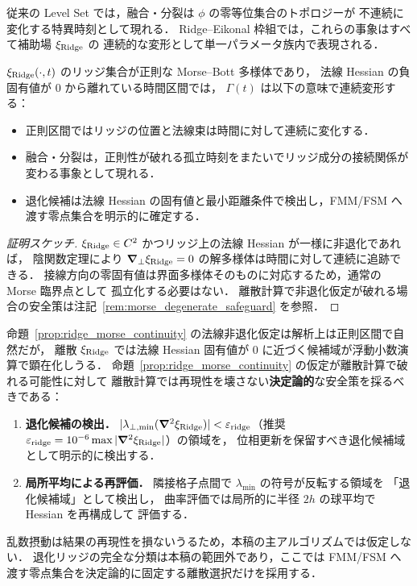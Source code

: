 従来の Level Set では，融合・分裂は $\phi$ の零等位集合のトポロジーが
不連続に変化する特異時刻として現れる．
Ridge--Eikonal 枠組では，これらの事象はすべて補助場 $\xi_{\text{Ridge}}$ の
連続的な変形として単一パラメータ族内で表現される．

\begin{proposition}[リッジ集合の正則区間での連続性]
\label{prop:ridge_morse_continuity}
$\xi_{\text{Ridge}}(\cdot, t)$ のリッジ集合が正則な Morse--Bott 多様体であり，
法線 Hessian の負固有値が 0 から離れている時間区間では，
$\Gamma(t)$ は以下の意味で連続変形する：
\begin{itemize}[leftmargin=1.5em, itemsep=0pt, topsep=2pt]
  \item 正則区間ではリッジの位置と法線束は時間に対して連続に変化する．
  \item 融合・分裂は，正則性が破れる孤立時刻をまたいでリッジ成分の接続関係が変わる事象として現れる．
  \item 退化候補は法線 Hessian の固有値と最小距離条件で検出し，FMM/FSM へ渡す零点集合を明示的に確定する．
\end{itemize}
\end{proposition}

\begin{proof}[\upshape 証明スケッチ]
$\xi_{\text{Ridge}} \in C^2$ かつリッジ上の法線 Hessian が一様に非退化であれば，
陰関数定理により $\bm{\nabla}_\perp\xi_{\text{Ridge}}=0$ の解多様体は時間に対して連続に追跡できる．
接線方向の零固有値は界面多様体そのものに対応するため，通常の Morse 臨界点として
孤立化する必要はない．
離散計算で非退化仮定が破れる場合の安全策は注記~\ref{rem:morse_degenerate_safeguard} を参照．
\end{proof}

\begin{remark}[退化リッジに対する数値的安全策]
\label{rem:morse_degenerate_safeguard}
命題~\ref{prop:ridge_morse_continuity} の法線非退化仮定は解析上は正則区間で自然だが，
離散 $\xi_{\text{Ridge}}$ では法線 Hessian 固有値が 0 に近づく候補域が浮動小数演算で顕在化しうる．
命題~\ref{prop:ridge_morse_continuity} の仮定が離散計算で破れる可能性に対して
離散計算では再現性を壊さない\textbf{決定論的}な安全策を採るべきである：
\begin{enumerate}[leftmargin=1.5em, itemsep=0pt, topsep=2pt]
  \item \textbf{退化候補の検出．}
        $|\lambda_{\perp,\min}(\bm{\nabla}^2\xi_{\text{Ridge}})| < \varepsilon_\text{ridge}$（推奨
        $\varepsilon_\text{ridge} = 10^{-6} \max|\bm{\nabla}^2\xi_{\text{Ridge}}|$）の領域を，
        位相更新を保留すべき退化候補域として明示的に検出する．
  \item \textbf{局所平均による再評価．}
        隣接格子点間で $\lambda_{\min}$ の符号が反転する領域を
        「退化候補域」として検出し，
        曲率評価では局所的に半径 $2h$ の球平均で Hessian を再構成して
        評価する．
\end{enumerate}
乱数摂動は結果の再現性を損ないうるため，本稿の主アルゴリズムでは仮定しない．
退化リッジの完全な分類は本稿の範囲外であり，ここでは
FMM/FSM へ渡す零点集合を決定論的に固定する離散選択だけを採用する．
\end{remark}

